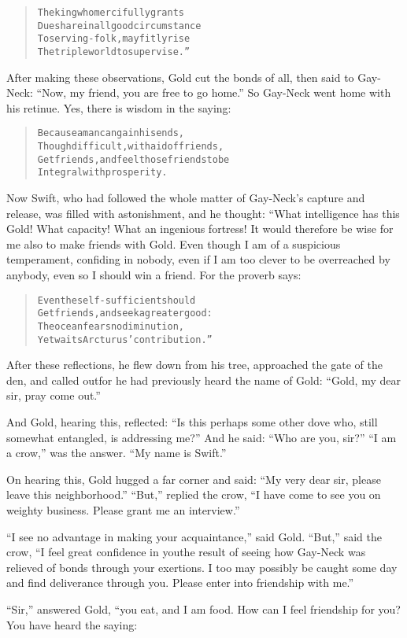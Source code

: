 \documentclass[article, twoside, 14pt]{memoir}
\renewenvironment{verbatim}{%
\begin{quote}%
\vskip -10pt%
\begin{alltt}\normalfont\large}{\end{alltt}%
\end{quote}%
\vskip -10pt
} %
\begin{document}
\begin{verbatim}
The king who mercifully grants
Due share in all good circumstance
To serving-folk, may fitly rise
The triple world to supervise.”
\end{verbatim}
After making these observations, Gold cut the bonds of all, then
said to Gay-Neck: ``Now, my friend, you are free to go home.'' So
Gay-Neck went home with his retinue. Yes, there is wisdom in the
saying:

\begin{verbatim}
Because a man can gain his ends,
Though difficult, with aid of friends,
Get friends, and feel those friends to be
Integral with prosperity.
\end{verbatim}
Now Swift, who had followed the whole matter of Gay-Neck's capture
and release, was filled with astonishment, and he thought: “What
intelligence has this Gold! What capacity! What an ingenious
fortress! It would therefore be wise for me also to make friends
with Gold. Even though I am of a suspicious temperament, confiding
in nobody, even if I am too clever to be overreached by anybody,
even so I should win a friend. For the proverb says:

\begin{verbatim}
Even the self-sufficient should
Get friends, and seek a greater good:
The ocean fears no diminution,
Yet waits Arcturus' contribution.”
\end{verbatim}
After these reflections, he flew down from his tree, approached the
gate of the den, and called out{\textemdash}for he had previously heard the
name of Gold: ``Gold, my dear sir, pray come out.''

And Gold, hearing this, reflected:
``Is this perhaps some other dove who, still somewhat entangled, is addressing me?''
And he said: ``Who are you, sir?'' ``I am a crow,'' was the answer.
``My name is Swift.''

On hearing this, Gold hugged a far corner and said:
``My very dear sir, please leave this neighborhood.'' ``But,''
replied the crow,
``I have come to see you on weighty business. Please grant me an interview.''

``I see no advantage in making your acquaintance,'' said Gold.
``But,'' said the crow,
``I feel great confidence in you{\textemdash}the result of seeing how Gay-Neck was relieved of bonds through your exertions. I too may possibly be caught some day and find deliverance through you. Please enter into friendship with me.''

``Sir,'' answered Gold, “you eat, and I am food. How can I feel
friendship for you? You have heard the saying:
\end{document}
